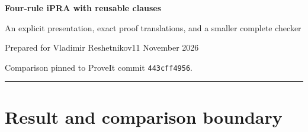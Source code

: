 \documentclass[11pt]{article}
\theoremstyle{definition}
\newcommand{\RR}{\mathcal R}
\begin{document}
\thispagestyle{empty}
{\Large\bfseries\color{ink} Four-rule iPRA with reusable clauses}\par
\vspace{0.4em}
{\large An explicit presentation, exact proof translations, and a smaller complete checker}\par
\vspace{0.8em}
Prepared for Vladimir Reshetnikov\hfill 11 November 2026\par
\textcolor{muted}{Comparison pinned to ProveIt commit \texttt{443cff4956}.}\par
\vspace{0.7em}\hrule\vspace{0.8em}

\begin{abstract}
We give an incremental simplification of the current ConciseIPRA presentation.
One fixed reusable clause, $\RR=[\,\,;y.(y=y)]$, and four inference schemes
--- Use, Step, Open, and Close --- present a theory bi-interpretable and
equiconsistent with full first-order intuitionistic primitive recursive
arithmetic. Universal reflexivity, ordinary hypotheses, and conditional
closures all use the same clause mechanism. Numerical terms are zero-normal
scalar iterators; all normalization is included in the checker.

We prove exact translations to and from the repository's five-pattern
zero-normal clause calculus, recover its arithmetic and logical interface,
and make both interpretation composites explicit. A complete standalone
Python checker, bidirectional certificate translators, negative controls,
and reproducible source measurements accompany the paper. The selected
checker has \SelectedBytes\ normalized bytes, \SelectedTokens\ significant
tokens, and \SelectedAST\ AST nodes, compared with $2950/829/902$ for the
pinned transparent five-pattern checker. The comparison includes parsing,
syntax and scope validation, hereditary substitution, all rules, and the
acceptance interface.

The improvement is a presentation and implementation reduction. Reflexivity
remains a counted axiom clause. No new minimum over the repository's compact
codecs, no absolute minimality theorem, and no new Lean verification are claimed.
\end{abstract}

\section{Result and comparison boundary}
\label{sec:main-result}
\end{document}

